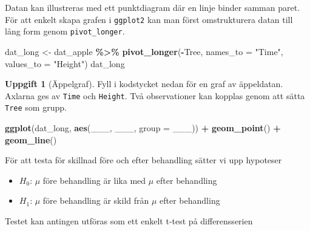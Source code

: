 \documentclass[
]{book}
\newenvironment{Shaded}{\begin{snugshade}}{\end{snugshade}}
\newcommand{\AttributeTok}[1]{\textcolor[rgb]{0.13,0.29,0.53}{#1}}
\newcommand{\FunctionTok}[1]{\textcolor[rgb]{0.13,0.29,0.53}{\textbf{#1}}}
\newcommand{\NormalTok}[1]{#1}
\newcommand{\OtherTok}[1]{\textcolor[rgb]{0.56,0.35,0.01}{#1}}
\newcommand{\SpecialCharTok}[1]{\textcolor[rgb]{0.81,0.36,0.00}{\textbf{#1}}}
\newcommand{\StringTok}[1]{\textcolor[rgb]{0.31,0.60,0.02}{#1}}
\providecommand{\tightlist}{%
  \setlength{\itemsep}{0pt}\setlength{\parskip}{0pt}}
\theoremstyle{definition}
\theoremstyle{definition}
\theoremstyle{definition}
\newtheorem{exercise}{Uppgift}[chapter]
\theoremstyle{definition}
\theoremstyle{remark}
\begin{document}
Datan kan illustreras med ett punktdiagram där en linje binder samman paret. För att enkelt skapa grafen i \texttt{ggplot2} kan man först omstrukturera datan till lång form genom \texttt{pivot\_longer}.

\begin{Shaded}
\begin{Highlighting}[]
\NormalTok{dat\_long }\OtherTok{\textless{}{-}}\NormalTok{ dat\_apple }\SpecialCharTok{\%\textgreater{}\%} 
  \FunctionTok{pivot\_longer}\NormalTok{(}\SpecialCharTok{{-}}\NormalTok{Tree, }\AttributeTok{names\_to =} \StringTok{"Time"}\NormalTok{, }\AttributeTok{values\_to =} \StringTok{"Height"}\NormalTok{)}
\NormalTok{dat\_long}
\end{Highlighting}
\end{Shaded}

\begin{exercise}[Äppelgraf]

Fyll i kodstycket nedan för en graf av äppeldatan. Axlarna ges av \texttt{Time} och \texttt{Height}. Två observationer kan kopplas genom att sätta \texttt{Tree} som grupp.

\begin{Shaded}
\begin{Highlighting}[]
\FunctionTok{ggplot}\NormalTok{(dat\_long, }\FunctionTok{aes}\NormalTok{(\_\_\_, \_\_\_, }\AttributeTok{group =}\NormalTok{ \_\_\_)) }\SpecialCharTok{+}
  \FunctionTok{geom\_point}\NormalTok{() }\SpecialCharTok{+}
  \FunctionTok{geom\_line}\NormalTok{()}
\end{Highlighting}
\end{Shaded}

\end{exercise}

För att testa för skillnad före och efter behandling sätter vi upp hypoteser

\begin{itemize}
\tightlist
\item
  \(H_0\): \(\mu\) före behandling är lika med \(\mu\) efter behandling
\item
  \(H_1\): \(\mu\) före behandling är skild från \(\mu\) efter behandling
\end{itemize}

Testet kan antingen utföras som ett enkelt t-test på differensserien

\begin{Shaded}
\end{Shaded}
\end{document}
